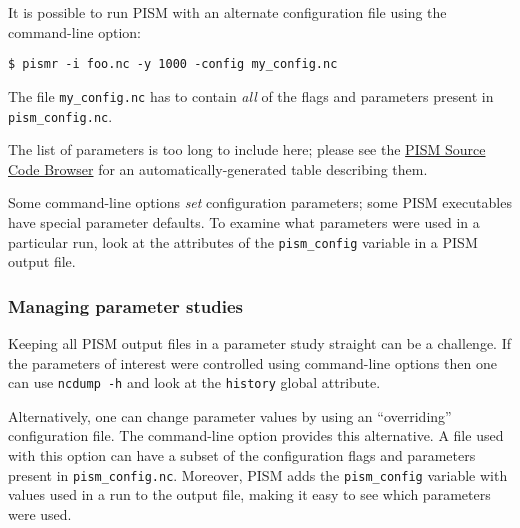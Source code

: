 It is possible to run PISM with an alternate configuration file using the  command-line option:
\begin{verbatim}
$ pismr -i foo.nc -y 1000 -config my_config.nc
\end{verbatim}
The file \texttt{my_config.nc} has to contain \emph{all} of the flags and parameters present in \texttt{pism_config.nc}.

The list of parameters is too long to include here; please see the \href{http://www.pism-docs.org/doxy/html/index.html}{PISM Source Code Browser} for an automatically-generated table describing them.

Some command-line options \emph{set} configuration parameters; some PISM executables have special parameter defaults. To examine what parameters were used in a particular run, look at the attributes of the \texttt{pism_config} variable in a PISM output file.

\subsubsection*{Managing parameter studies}
\label{sec:parameter-studies}
Keeping all PISM output files in a parameter study straight can be a challenge.  If the parameters of interest were controlled using command-line options then one can use \texttt{ncdump -h} and look at the \texttt{history} global attribute.

Alternatively, one can change parameter values by using an ``overriding'' configuration file.  The  command-line option provides this alternative.  A file used with this option can have a subset of the configuration flags and parameters present in \texttt{pism_config.nc}. Moreover, PISM adds the \texttt{pism_config} variable with values used in a run to the output file, making it easy to see which parameters were used.

